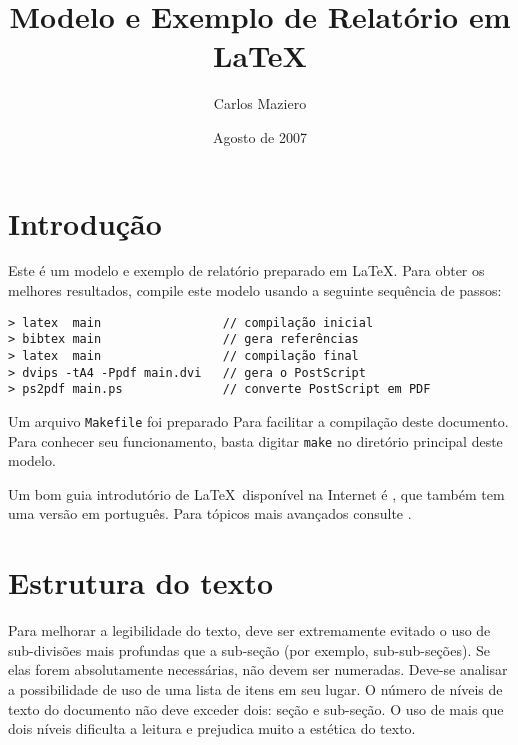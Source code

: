 \documentclass [12pt,oneside] {article}
\begin{document}
\title {Modelo e Exemplo de Relatório em \LaTeX}
\author {Carlos Maziero}
\date {Agosto de 2007}
\maketitle


\section{Introdução}

Este é um modelo e exemplo de relatório preparado em \LaTeX. Para obter os melhores resultados, compile este modelo usando a seguinte sequência de passos:

\begin{footnotesize}
\begin{verbatim}
> latex  main                 // compilação inicial
> bibtex main                 // gera referências
> latex  main                 // compilação final
> dvips -tA4 -Ppdf main.dvi   // gera o PostScript
> ps2pdf main.ps              // converte PostScript em PDF
\end{verbatim}
\end{footnotesize}

Um arquivo \texttt{Makefile} foi preparado Para facilitar a compilação deste documento. Para conhecer seu funcionamento, basta digitar \texttt{make} no diretório principal deste modelo.

Um bom guia introdutório de \LaTeX\ disponível na Internet é \cite{oetiker07}, que também tem uma versão em português. Para tópicos mais avançados consulte \cite{goossens93}.


\section{Estrutura do texto}

Para melhorar a legibilidade do texto, deve ser extremamente evitado o uso de sub-divisões mais profundas que a sub-seção (por exemplo, sub-sub-seções). Se elas forem absolutamente necessárias, não devem ser numeradas. Deve-se analisar a possibilidade de uso de uma lista de itens em seu lugar. O número de níveis de texto do documento não deve exceder dois: seção e sub-seção. O uso de mais que dois níveis dificulta a leitura e prejudica muito a estética do texto.
\end{document}
